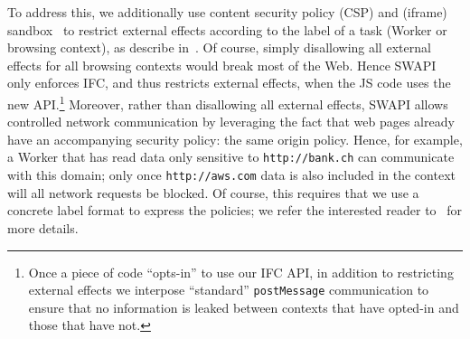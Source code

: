 To address this, we additionally use content security policy (CSP) and
(iframe) sandbox~\tocite{} to restrict external effects according to
the label of a task (Worker or browsing context), as describe
in~\tocite{}.
%
Of course, simply disallowing all external effects for all browsing
contexts would break most of the Web.
%
Hence SWAPI only enforces IFC, and thus restricts external effects,
when the JS code uses the new API.\footnote{
  Once a piece of code ``opts-in'' to use our IFC API, in addition to
  restricting external effects we interpose ``standard''
  \texttt{postMessage} communication to ensure that no information is
  leaked between contexts that have opted-in and those that have not.
}
%
Moreover, rather than disallowing all external effects, SWAPI allows
controlled network communication by leveraging the fact that web
pages already have an accompanying security policy: the same origin
policy.
%
Hence, for example, a Worker that has read data only sensitive to
\texttt{http://bank.ch} can communicate with this domain; only once
\texttt{http://aws.com} data is also included in the context will all
network requests be blocked.
%
Of course, this requires that we use a concrete label format to
express the policies; we refer the interested reader to~\tocite{} for
more details.
